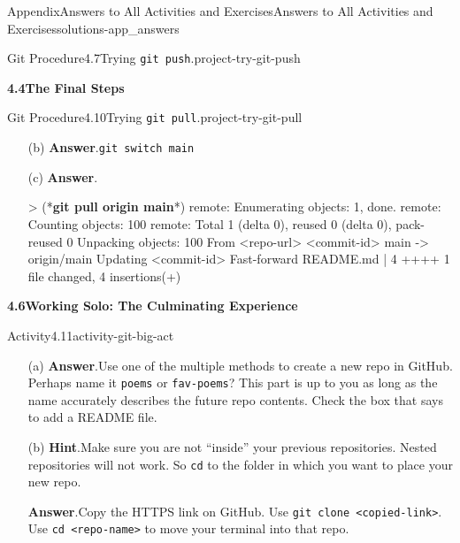 \documentclass[twoside,10pt,]{book}
\newcommand{\blocktitlefont}{\relax}
\newcommand{\mono}[1]{\texttt{#1}}
\newcommand{\consoleinput}[1]{\textbf{#1}}
\begin{document}
\begin{solutions-chapter}{Appendix}{Answers to All Activities and Exercises}{}{Answers to All Activities and Exercises}{}{}{solutions-app_answers}
\begin{projectsolution}{Git Procedure}{4.7}{Trying \mono{git push}.}{project-try-git-push}
\begin{enumerate}[font=\bfseries,label=(\alph*),ref=\alph*]
\begin{enumerate}[font=\bfseries,label=(\roman*),ref=\theenumi.\roman*]
\end{enumerate}%
\end{enumerate}%
\end{projectsolution}%
\par\medskip
\noindent\textbf{\Large{}4.4\space\textperiodcentered\space{}The Final Steps}
\begin{projectsolution}{Git Procedure}{4.10}{Trying \mono{git pull}.}{project-try-git-pull}%
\begin{enumerate}[font=\bfseries,label=(\alph*),ref=\alph*]%
\item[(b)]\noindent\textbf{\blocktitlefont Answer}.\hypertarget{answer-try-git-pull-f-b-back}{}\quad{}\mono{git switch main}%
\item[(c)]\noindent\textbf{\blocktitlefont Answer}.\hypertarget{answer-try-git-pull-g-b-back}{}\quad{}\begin{console}{0}{1}{0}
> (*\consoleinput{git pull origin main}*)
remote: Enumerating objects: 1, done.
remote: Counting objects: 100%
remote: Total 1 (delta 0), reused 0 (delta 0), pack-reused 0
Unpacking objects: 100%
From <repo-url>
   <commit-id>  main       -> origin/main
Updating <commit-id>
Fast-forward
 README.md | 4 ++++
 1 file changed, 4 insertions(+)
\end{console}
\end{enumerate}%
\end{projectsolution}%
\par\medskip
\noindent\textbf{\Large{}4.6\space\textperiodcentered\space{}Working Solo: The Culminating Experience}
\begin{activitysolution}{Activity}{4.11}{}{activity-git-big-act}%
\begin{enumerate}[font=\bfseries,label=(\alph*),ref=\alph*]%
\item[(a)]\noindent\textbf{\blocktitlefont Answer}.\hypertarget{answer-git-ba-newrepo-b-back}{}\quad{}Use one of the multiple methods to create a new repo in GitHub. Perhaps name it \mono{poems} or \mono{fav-poems}? This part is up to you as long as the name accurately describes the future repo contents. Check the box that says to add a README file.%
\item[(b)]\noindent\textbf{\blocktitlefont Hint}.\hypertarget{hint-git-ba-clone-b-back}{}\quad{}Make sure you are not ``inside'' your previous repositories. Nested repositories will not work. So \mono{cd} to the folder in which you want to place your new repo.%
\par\smallskip%
\noindent\textbf{\blocktitlefont Answer}.\hypertarget{answer-git-ba-clone-c-back}{}\quad{}Copy the HTTPS link on GitHub. Use \mono{git clone <copied-link>}. Use \mono{cd <repo-name>} to move your terminal into that repo.%

\end{enumerate}
\end{activitysolution}
\end{solutions-chapter}
\end{document}
